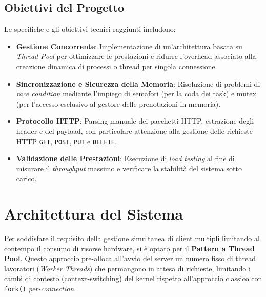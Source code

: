 \documentclass[a4paper,12pt]{article}
\begin{document}
\subsection{Obiettivi del Progetto}
Le specifiche e gli obiettivi tecnici raggiunti includono:
\begin{itemize}
    \item \textbf{Gestione Concorrente}: Implementazione di un'architettura basata su \textit{Thread Pool} per ottimizzare le prestazioni e ridurre l'overhead associato alla creazione dinamica di processi o thread per singola connessione.
    \item \textbf{Sincronizzazione e Sicurezza della Memoria}: Risoluzione di problemi di \textit{race condition} mediante l'impiego di semafori (per la coda dei task) e mutex (per l'accesso esclusivo al gestore delle prenotazioni in memoria).
    \item \textbf{Protocollo HTTP}: Parsing manuale dei pacchetti HTTP, estrazione degli header e del payload, con particolare attenzione alla gestione delle richieste HTTP \texttt{GET}, \texttt{POST}, \texttt{PUT} e \texttt{DELETE}.
    \item \textbf{Validazione delle Prestazioni}: Esecuzione di \textit{load testing} al fine di misurare il \textit{throughput} massimo e verificare la stabilità del sistema sotto carico.
\end{itemize}

\newpage
\section{Architettura del Sistema}
Per soddisfare il requisito della gestione simultanea di client multipli limitando al contempo il consumo di risorse hardware, si è optato per il \textbf{Pattern a Thread Pool}. Questo approccio pre-alloca all'avvio del server un numero fisso di thread lavoratori (\textit{Worker Threads}) che permangono in attesa di richieste, limitando i cambi di contesto (context-switching) del kernel rispetto all'approccio classico con \texttt{fork()} \textit{per-connection}.
\end{document}
